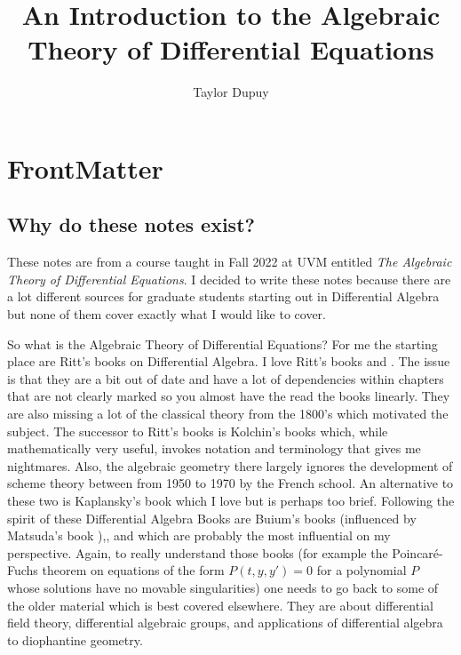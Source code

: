 \documentclass[]{book}
\title{An Introduction to the Algebraic Theory of Differential Equations}
\author{Taylor Dupuy }
\numberwithin{equation}{section}
\theoremstyle{definition}
\theoremstyle{remark}
\begin{document}
\maketitle

\frontmatter

\tableofcontents

\chapter{FrontMatter}

\section{Why do these notes exist?}
These notes are from a course taught in Fall 2022 at UVM entitled \emph{The Algebraic Theory of Differential Equations}. 
I decided to write these notes because there are a lot different sources for graduate students starting out in Differential Algebra but none of them cover exactly what I would like to cover. 

So what is the Algebraic Theory of Differential Equations? 
For me the starting place are Ritt's books on Differential Algebra. 
I love Ritt's books \cite{Ritt1932} and \cite{Ritt1950}. 
The issue is that they are a bit out of date and have a lot of dependencies within chapters that are not clearly marked so you almost have the read the books linearly. 
They are also missing a lot of the classical theory from the 1800's which motivated the subject. 
The successor to Ritt's books is Kolchin's books \cite{Kolchin1973} which, while mathematically very useful, invokes notation and terminology that gives me nightmares. 
Also, the algebraic geometry there largely ignores the development of scheme theory between from 1950 to 1970 by the French school. 
An alternative to these two is Kaplansky's book \cite{Kaplansky1976} which I love but is perhaps too brief. 
Following the spirit of these Differential Algebra Books are Buium's books \cite{Buium1986} (influenced by Matsuda's book \cite{Matsuda1980}),\cite{Buium1992}, and \cite{Buium1994} which are probably the most influential on my perspective. 
Again, to really understand those books (for example the Poincar\'e-Fuchs theorem on equations of the form $P(t,y,y')=0$ for a polynomial $P$ whose solutions have no movable singularities) one needs to go back to some of the older material which is best covered elsewhere.
They are about differential field theory, differential algebraic groups, and applications of differential algebra to diophantine geometry.
\end{document}
